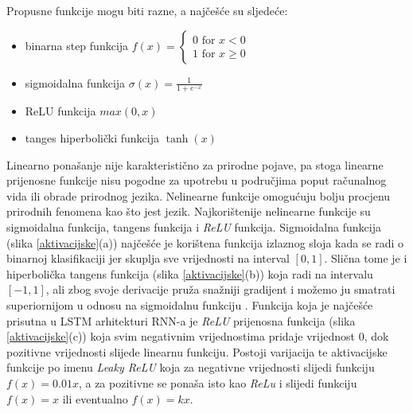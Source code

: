 \documentclass[times, utf8, zavrsni]{fer}
\begin{document}
Propusne funkcije mogu biti razne, a najčešće su sljedeće:
\begin{itemize}
	\item binarna step funkcija $f(x)=\left\{\begin{array}{l}0 \text { for } x<0 \\1 \text { for } x \geq 0\end{array}\right.$
	\item sigmoidalna funkcija $\sigma(x)=\frac{1}{1+e^{-x}}$
	\item ReLU funkcija $max(0,x)$
	\item tanges hiperbolički funkcija $\tanh(x)$
\end{itemize}
Linearno ponašanje nije karakteristično za prirodne pojave, pa stoga linearne prijenosne funkcije nisu pogodne za upotrebu u područjima poput računalnog vida ili obrade prirodnog jezika. Nelinearne funkcije omogućuju bolju procjenu prirodnih fenomena kao što jest jezik. Najkorištenije nelinearne funkcije su sigmoidalna funkcija, tangens funkcija i \emph{ReLU} funkcija. Sigmoidalna funkcija (slika \ref{aktivacijske}(a)) najčešće je korištena funkcija izlaznog sloja kada se radi o binarnoj klasifikaciji jer skuplja sve vrijednosti na interval $[0,1]$. Slična tome je i hiperbolička tangens funkcija (slika \ref{aktivacijske}(b)) koja radi na intervalu $[-1,1]$, ali zbog svoje derivacije pruža snažniji gradijent i možemo ju smatrati superiornijom u odnosu na sigmoidalnu funkciju \citep{akt}. Funkcija koja je najčešće prisutna u \gls{LSTM} arhitekturi \gls{RNN}-a je \emph{ReLU} prijenosna funkcija (slika \ref{aktivacijske}(c)) koja svim negativnim vrijednostima pridaje vrijednost 0, dok pozitivne vrijednosti slijede linearnu funkciju. Postoji varijacija te aktivacijske funkcije po imenu \emph{Leaky ReLU} koja za negativne vrijednosti slijedi funkciju $f(x) = 0.01x$, a za pozitivne se ponaša isto kao \emph{ReLu} i slijedi funkciju $f(x) = x$ ili eventualno $f(x) = kx$.
\end{document}

